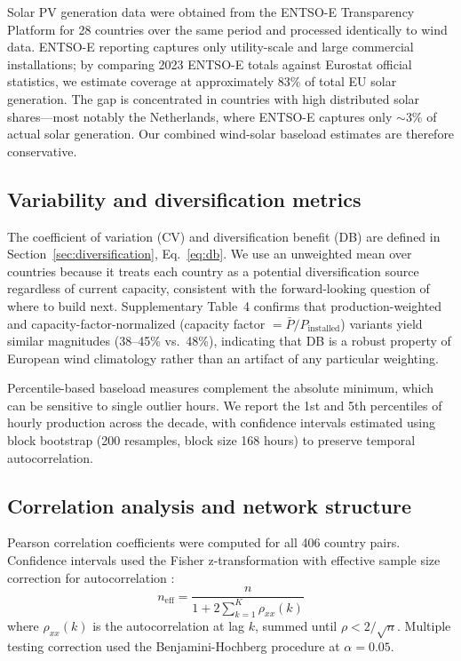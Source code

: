\documentclass{article}
\begin{document}
Solar PV generation data were obtained from the ENTSO-E Transparency Platform for 28 countries over the same period and processed identically to wind data. ENTSO-E reporting captures only utility-scale and large commercial installations; by comparing 2023 ENTSO-E totals against Eurostat official statistics, we estimate coverage at approximately 83\% of total EU solar generation. The gap is concentrated in countries with high distributed solar shares---most notably the Netherlands, where ENTSO-E captures only $\sim$3\% of actual solar generation. Our combined wind-solar baseload estimates are therefore conservative.

\subsection{Variability and diversification metrics}

The coefficient of variation (CV) and diversification benefit (DB) are defined in Section~\ref{sec:diversification}, Eq.~\ref{eq:db}. We use an unweighted mean over countries because it treats each country as a potential diversification source regardless of current capacity, consistent with the forward-looking question of where to build next. Supplementary Table~4 confirms that production-weighted and capacity-factor-normalized (capacity factor $= \bar{P}/P_{\text{installed}}$) variants yield similar magnitudes (38--45\% vs.\ 48\%), indicating that DB is a robust property of European wind climatology rather than an artifact of any particular weighting.

Percentile-based baseload measures complement the absolute minimum, which can be sensitive to single outlier hours. We report the 1st and 5th percentiles of hourly production across the decade, with confidence intervals estimated using block bootstrap (200 resamples, block size 168 hours) to preserve temporal autocorrelation.

\subsection{Correlation analysis and network structure}

Pearson correlation coefficients were computed for all 406 country pairs. Confidence intervals used the Fisher z-transformation with effective sample size correction for autocorrelation \citep{bayley1946}:
\begin{equation}
    n_{\text{eff}} = \frac{n}{1 + 2\sum_{k=1}^{K} \rho_{xx}(k)}
\end{equation}
where $\rho_{xx}(k)$ is the autocorrelation at lag $k$, summed until $\rho < 2/\sqrt{n}$. Multiple testing correction used the Benjamini-Hochberg procedure at $\alpha = 0.05$.
\end{document}
